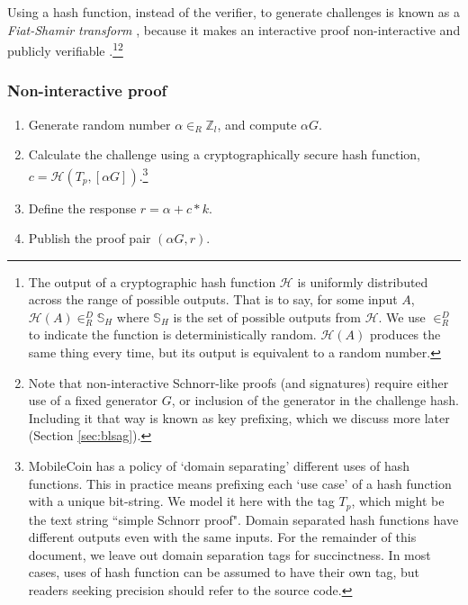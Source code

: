 Using a hash function, instead of the verifier, to generate challenges is known as a {\em Fiat-Shamir transform} \cite{fiat-shamir-transform}, because it makes an interactive proof non-interactive and publicly verifiable \cite{Signatures2015BorromeanRS}.\footnote{The output of a cryptographic hash function $\mathcal{H}$ is uniformly distributed across the range of possible outputs. That is to say, for some input $A$, $\mathcal{H}(A) \in^D_R \mathbb{S}_H$ where $\mathbb{S}_H$ is the set of possible outputs from $\mathcal{H}$. We use $\in^D_R$ to indicate the function is deterministically random. $\mathcal{H}(A)$ produces the same thing every time, but its output is equivalent to a random number.
}\footnote{Note that non-interactive Schnorr-like proofs (and signatures) require either use of a fixed generator $G$, or inclusion of the generator in the challenge hash. Including it that way is known as key prefixing, which we discuss more later (Section \ref{sec:blsag}).}%

\subsubsection*{Non-interactive proof}

\begin{enumerate}
	\item Generate random number $\alpha \in_R \mathbb{Z}_l$, and compute $\alpha G$.
	\item Calculate the challenge using a cryptographically secure hash function, \(c = \mathcal{H}(T_p, [\alpha G])\).\footnote{MobileCoin has a policy of `domain separating' \cite{domain-separation-context-labels} different uses of hash functions. This in practice means prefixing each `use case' of a hash function with a unique bit-string. We model it here with the tag $T_p$, which might be the text string ``simple Schnorr proof". Domain separated hash functions have different outputs even with the same inputs. For the remainder of this document, we leave out domain separation tags for succinctness. In most cases, uses of hash function can be assumed to have their own tag, but readers seeking precision should refer to the source code.}
	\item Define the response $r = \alpha + c*k$.
	\item Publish the proof pair $(\alpha G, r)$.
\end{enumerate}

